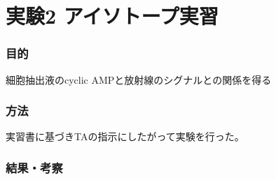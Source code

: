 \documentclass[a4paper,papersize,dvipdfmx]{jsarticle}
\begin{document}
\part*{実験2 アイソトープ実習}

\section*{目的}
細胞抽出液のcyclic AMPと放射線のシグナルとの関係を得る

\section*{方法}
実習書に基づきTAの指示にしたがって実験を行った。

\section*{結果・考察}
\end{document}
